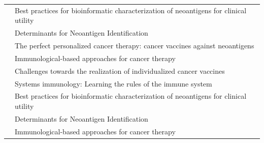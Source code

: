 \begin{table}[H]
\begin{tabular}{p{3cm}p{10cm}}
		\cite{richters2019best}       & Best practices for bioinformatic characterization of neoantigens for clinical utility                                                         \\
		\cite{garcia2019determinants} & Determinants for Neoantigen Identification                                                                                                    \\
		\cite{aurisicchio2018perfect} & The perfect personalized cancer therapy: cancer vaccines against neoantigens                                                                  \\
		\cite{barros2018immunological}& Immunological-based approaches for cancer therapy                                                                                             \\
		\cite{tureci2018challenges}   & Challenges towards the realization of individualized cancer vaccines                                                                          \\
		\cite{villani2018systems}     & Systems immunology: Learning the rules of the immune system                                                                                   \\
		\cite{richters2019best}       & Best practices for bioinformatic characterization of neoantigens for clinical utility                                                         \\
		\cite{garcia2019determinants} & Determinants for Neoantigen Identification                                                                                                    	                                                               \\
		\cite{barros2018immunological}& Immunological-based approaches for cancer therapy                                                                                            \\	
	                                                                                
	\end{tabular}
\end{table}






